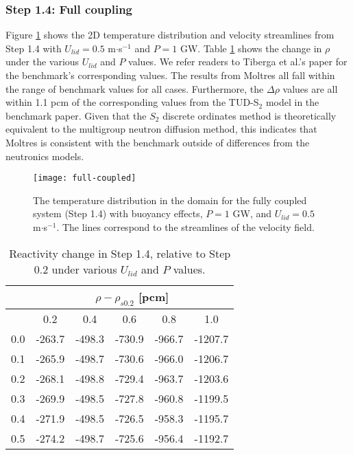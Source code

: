 \FloatBarrier

\subsubsection{Step 1.4: Full coupling}

Figure \ref{fig:color} shows the 2D temperature distribution and velocity
streamlines from Step 1.4 with $U_{lid} = 0.5$ m$\cdot$s$^{-1}$ and $P = 1$ GW.
Table \ref{table:full} shows the change in $\rho$ under the various $U_{lid}$
and $P$ values. We refer readers to Tiberga et al.'s paper
\citep{tiberga_results_2020} for the benchmark's corresponding values.
The results from Moltres all fall within the range of benchmark values for all
cases. Furthermore, the $\Delta\rho$ values are all within 1.1 pcm of the
corresponding values from the TUD-S$_2$ model in the benchmark paper. Given
that the $S_2$ discrete ordinates method is theoretically equivalent to the
multigroup neutron diffusion method, this indicates that Moltres is
consistent with the benchmark outside of differences from the neutronics
models.

\begin{figure}[htb]
  \centering
  \texttt{[image: full-coupled]}
  \caption{The temperature distribution in the domain for the fully coupled
  system (Step 1.4) with buoyancy effects, $P = 1$ GW, and $U_{lid} = 0.5$
  m$\cdot$s$^{-1}$. The lines correspond to the streamlines of the velocity
  field.}
  \label{fig:color}
\end{figure}
%
\begin{table}[htb]
	\caption{Reactivity change in Step 1.4, relative to Step 0.2 under various
	$U_{lid}$ and $P$ values.}
	\centering
	\footnotesize
	\setlength\tabcolsep{1.5pt}
	\begin{tabular}{c c c c c c}
		\toprule
		& \multicolumn{5}{c}{$\rho - \rho_{s0.2}$ [pcm]} \\
		\midrule
		{\backslashbox{$U_{lid}$ [m$\cdot$s$^{-1}$]}{$P$ [GW]}} & 0.2 & 0.4 & 0.6 & 0.8 & 1.0 \\
		\midrule
		0.0 & -263.7 & -498.3 & -730.9 & -966.7 & -1207.7 \\
		0.1 & -265.9 & -498.7 & -730.6 & -966.0 & -1206.7 \\
		0.2 & -268.1 & -498.8 & -729.4 & -963.7 & -1203.6 \\
		0.3 & -269.9 & -498.5 & -727.8 & -960.8 & -1199.5 \\
		0.4 & -271.9 & -498.5 & -726.5 & -958.3 & -1195.7 \\
		0.5 & -274.2 & -498.7 & -725.6 & -956.4 & -1192.7 \\
		\bottomrule
	\end{tabular}
	\label{table:full}
\end{table}

